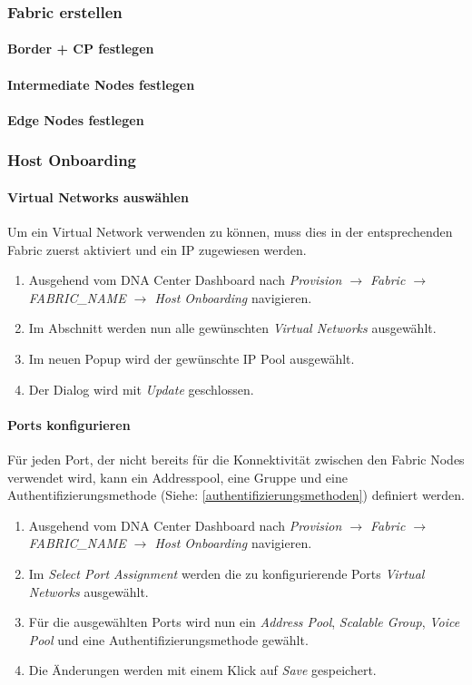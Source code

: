 \subsubsection{Fabric erstellen}
\paragraph{Border + CP festlegen}
\paragraph{Intermediate Nodes festlegen}
\paragraph{Edge Nodes festlegen}

\subsubsection{Host Onboarding}

\paragraph{Virtual Networks auswählen}
Um ein Virtual Network verwenden zu können, muss dies in der entsprechenden Fabric zuerst aktiviert und ein IP zugewiesen werden. 
\begin{enumerate}
	\item Ausgehend vom DNA Center Dashboard nach \textit{Provision $\rightarrow$ Fabric $\rightarrow$ FABRIC\_NAME $\rightarrow$ Host Onboarding} navigieren. 
	\item Im Abschnitt werden nun alle gewünschten \textit{Virtual Networks} ausgewählt. 
	\item Im neuen Popup wird der gewünschte IP Pool ausgewählt. 
	\item Der Dialog wird mit \textit{Update} geschlossen.
\end{enumerate}


\paragraph{Ports konfigurieren}
Für jeden Port, der nicht bereits für die Konnektivität zwischen den Fabric Nodes verwendet wird, kann ein Addresspool, eine Gruppe und eine Authentifizierungsmethode (Siehe: \ref{authentifizierungsmethoden}) definiert werden. 
\begin{enumerate}
	\item Ausgehend vom DNA Center Dashboard nach \textit{Provision $\rightarrow$ Fabric $\rightarrow$ FABRIC\_NAME $\rightarrow$ Host Onboarding} navigieren. 
	\item Im \textit{Select Port Assignment} werden die zu konfigurierende Ports \textit{Virtual Networks} ausgewählt. 
	\item Für die ausgewählten Ports wird nun ein \textit{Address Pool}, \textit{Scalable Group}, \textit{Voice Pool} und eine Authentifizierungsmethode gewählt. 
	\item Die Änderungen werden mit einem Klick auf \textit{Save} gespeichert. 
\end{enumerate}



